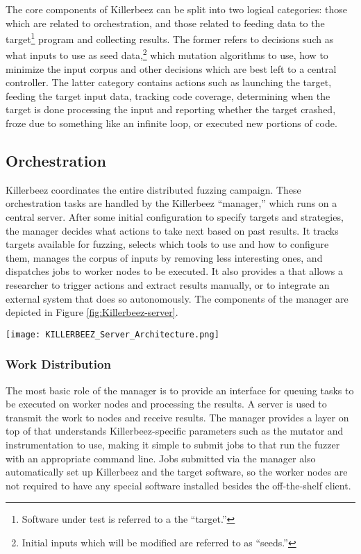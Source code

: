 The core components of Killerbeez can be split into two logical categories:
those which are related to orchestration, and those related to feeding data
to the target\footnote{Software under test is referred to a the ``target.''}
program and collecting results.  The former refers to decisions such as what
inputs to use as seed data,\footnote{Initial inputs which will be modified
are referred to as ``seeds.''} which mutation algorithms to use, how to minimize
the input corpus and other decisions which are best left to a central
controller.  The latter category contains actions such as launching the target,
feeding the target input data, tracking code coverage, determining when the target is
done processing the input and reporting whether the target crashed, froze due
to something like an infinite loop, or executed new portions of code.

\subsection{Orchestration}
Killerbeez coordinates the entire distributed fuzzing
campaign. These orchestration tasks are handled by the Killerbeez ``manager,''
which runs on a central server. After some initial configuration to specify
targets and strategies, the manager decides what actions to take next based on
past results. It tracks targets available for fuzzing, selects which tools to
use and how to configure them, manages the corpus of inputs by removing
less interesting ones, and dispatches jobs to worker nodes to be executed.  It also
provides a \REST{} \API{} that allows a researcher to trigger actions and
extract results manually, or to integrate an external system that
does so autonomously. The components of the manager are depicted in Figure
\ref{fig:Killerbeez-server}.

\begin{figure*}[htb]
\centering
\texttt{[image: KILLERBEEZ\_Server\_Architecture.png]}
\caption{Killerbeez Server Architecture}
\label{fig:Killerbeez-server}
\end{figure*}

\subsubsection{Work Distribution}
The most basic role of the manager is to provide an interface for queuing tasks
to be executed on worker nodes and processing the results. A \BOINC{} server is
used to transmit the work to nodes and receive results. The manager provides a
layer on top of \BOINC{} that understands Killerbeez-specific parameters such as
the mutator and instrumentation to use, making it simple to submit jobs to
\BOINC{} that run the fuzzer with an appropriate command line. Jobs
submitted via the manager also automatically set up Killerbeez and the target
software, so the worker nodes are not required to have any special software
installed besides the off-the-shelf \BOINC{} client.

